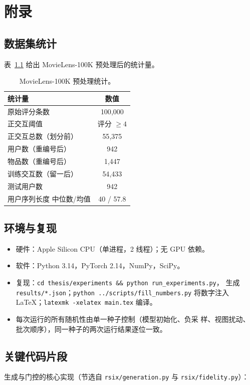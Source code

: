 \chapter{附录}

\section{数据集统计}
表~\ref{tab:dataset} 给出 MovieLens-100K 预处理后的统计量。

\begin{table}[h]
\centering
\caption{MovieLens-100K 预处理统计。}
\label{tab:dataset}
\begin{tabular}{lc}
\toprule
统计量 & 数值 \\
\midrule
原始评分条数 & 100{,}000 \\
正交互阈值 & 评分 $\geq 4$ \\
正交互总数（划分前） & 55{,}375 \\
用户数（重编号后） & 942 \\
物品数（重编号后） & 1{,}447 \\
训练交互数（留一后） & 54{,}433 \\
测试用户数 & 942 \\
用户序列长度 中位数/均值 & 40 / 57.8 \\
\bottomrule
\end{tabular}
\end{table}

\section{环境与复现}
\begin{itemize}
\item 硬件：Apple Silicon CPU（单进程，2 线程）；无 GPU 依赖。
\item 软件：Python 3.14，PyTorch 2.14，NumPy，SciPy。
\item 复现：\texttt{cd thesis/experiments \&\& python run\_experiments.py}，
生成 \texttt{results/*.json}；\texttt{python ../scripts/fill\_numbers.py}
将数字注入 \LaTeX{}；\texttt{latexmk -xelatex main.tex} 编译。
\item 每次运行的所有随机性由单一种子控制（模型初始化、负采
样、视图扰动、批次顺序），同一种子的两次运行结果逐位一致。
\end{itemize}

\section{关键代码片段}
生成与门控的核心实现（节选自 \texttt{rsix/generation.py} 与
\texttt{rsix/fidelity.py}）：

